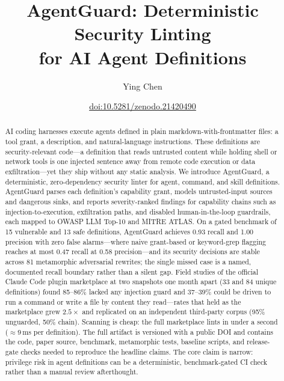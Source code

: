 \documentclass[11pt]{article}
\title{AgentGuard: Deterministic Security Linting\\for AI Agent Definitions}
\author{Ying Chen}
\date{\href{https://doi.org/10.5281/zenodo.21420490}{doi:10.5281/zenodo.21420490}}
\begin{document}
\maketitle

\begin{abstract}
AI coding harnesses execute agents defined in plain markdown-with-frontmatter files: a tool grant,
a description, and natural-language instructions. These definitions are security-relevant code---a
definition that reads untrusted content while holding shell or network tools is one injected
sentence away from remote code execution or data exfiltration---yet they ship without any static
analysis. We introduce AgentGuard, a deterministic, zero-dependency security linter for agent,
command, and skill definitions. AgentGuard parses each definition's capability grant, models
untrusted-input sources and dangerous sinks, and reports severity-ranked findings for capability
chains such as injection-to-execution, exfiltration paths, and disabled human-in-the-loop
guardrails, each mapped to OWASP LLM Top-10 and MITRE ATLAS. On a gated benchmark of 15 vulnerable
and 13 safe definitions, AgentGuard achieves 0.93 recall and 1.00 precision with zero false
alarms---where naive grant-based or keyword-grep flagging reaches at most 0.47 recall at 0.58
precision---and its security decisions are stable across 81 metamorphic adversarial rewrites; the
single missed case is a named, documented recall boundary rather than a silent gap. Field studies
of the official Claude Code plugin marketplace at two snapshots one month apart (33 and 84 unique
definitions) found 85--86\% lacked any injection guard and 37--39\% could be driven to run a
command or write a file by content they read---rates that held as the marketplace grew
$2.5\times$ and replicated on an independent third-party corpus (95\% unguarded, 50\% chain).
Scanning is cheap: the full marketplace lints in under a second ($\approx$9\,ms per definition).
The full artifact is versioned with a public DOI and contains the code, paper source, benchmark,
metamorphic tests, baseline scripts, and release-gate checks needed to reproduce the headline
claims. The core claim is narrow: privilege risk in agent definitions can be a deterministic,
benchmark-gated CI check rather than a manual review afterthought.
\end{abstract}
\end{document}
